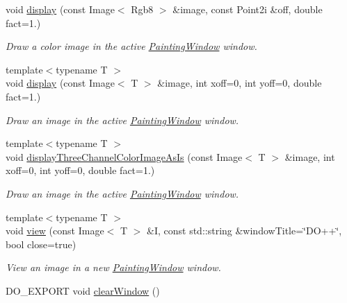 \begin{DoxyCompactItemize}
void \hyperlink{group___draw2_d_ga295040f0084e284ebe3a020e10aff55e}{display} (const Image$<$ Rgb8 $>$ \&image, const Point2i \&off, double fact=1.)
\begin{DoxyCompactList}\small\item\em Draw a color image in the active \hyperlink{class_d_o_1_1_painting_window}{Painting\-Window} window. \end{DoxyCompactList}\item 
{\footnotesize template$<$typename T $>$ }\\void \hyperlink{group___draw2_d_ga79613afee03373bbd813403651582f6b}{display} (const Image$<$ T $>$ \&image, int xoff=0, int yoff=0, double fact=1.)
\begin{DoxyCompactList}\small\item\em Draw an image in the active \hyperlink{class_d_o_1_1_painting_window}{Painting\-Window} window. \end{DoxyCompactList}\item 
{\footnotesize template$<$typename T $>$ }\\void \hyperlink{group___draw2_d_gab725fb61c4c95346186b4b64c842297d}{display\-Three\-Channel\-Color\-Image\-As\-Is} (const Image$<$ T $>$ \&image, int xoff=0, int yoff=0, double fact=1.)
\begin{DoxyCompactList}\small\item\em Draw an image in the active \hyperlink{class_d_o_1_1_painting_window}{Painting\-Window} window. \end{DoxyCompactList}\item 
\hypertarget{group___draw2_d_ga15abf15c4ccee6805650834016a512d3}{{\footnotesize template$<$typename T $>$ }\\void \hyperlink{group___draw2_d_ga15abf15c4ccee6805650834016a512d3}{view} (const Image$<$ T $>$ \&I, const std\-::string \&window\-Title=\char`\"{}D\-O++\char`\"{}, bool close=true)}\label{group___draw2_d_ga15abf15c4ccee6805650834016a512d3}

\begin{DoxyCompactList}\small\item\em View an image in a new \hyperlink{class_d_o_1_1_painting_window}{Painting\-Window} window. \end{DoxyCompactList}\item 
\hypertarget{group___draw2_d_ga91250b6a86a927c0570061883fd5a21b}{D\-O\-\_\-\-E\-X\-P\-O\-R\-T void \hyperlink{group___draw2_d_ga91250b6a86a927c0570061883fd5a21b}{clear\-Window} ()}\label{group___draw2_d_ga91250b6a86a927c0570061883fd5a21b}


\end{DoxyCompactItemize}
